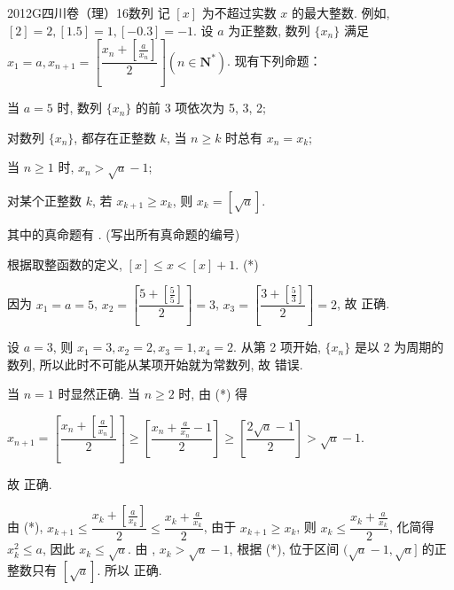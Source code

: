 
\begin{problem}{2012}{G}{四川卷（理）}{16}{数列}
记 $[x]$ 为不超过实数 $x$ 的最大整数. 例如, $[2]=2, [1.5]=1, [-0.3]=-1$. 设 $a$ 为正整数, 数列 $\{x_n\}$ 满足 $x_1=a, x_{n+1}=\left[\dfrac{x_n+[\frac{a}{x_n}]}{2}\right] (n \in \mathbf{N}^*)$. 现有下列命题：

 当 $a=5$ 时, 数列 $\{x_n\}$ 的前 3 项依次为 5, 3, 2;

 对数列 $\{x_n\}$, 都存在正整数 $k$, 当 $n \ge k$ 时总有 $x_n=x_k$;

 当 $n \ge 1$ 时, $x_n > \sqrt{a}-1$;

 对某个正整数 $k$, 若 $x_{k+1} \ge x_k$, 则 $x_k = [\sqrt{a}]$.

其中的真命题有 \underline{\hspace{4em}}. (写出所有真命题的编号)
\end{problem}

\begin{answer}
\end{answer}

\begin{solutions}
根据取整函数的定义, $[x] \le x < [x]+1$. (*)

 因为 $x_1=a=5$, $x_2=\left[\dfrac{5+[\frac{5}{5}]}{2}\right]=3$, $x_3=\left[\dfrac{3+[\frac{5}{3}]}{2}\right]=2$, 故  正确.

 设 $a=3$, 则 $x_1=3, x_2=2, x_3=1, x_4=2$. 从第 2 项开始, $\{x_n\}$ 是以 2 为周期的数列, 所以此时不可能从某项开始就为常数列, 故  错误.

 当 $n=1$ 时显然正确. 当 $n \ge 2$ 时, 由 (*) 得

$x_{n+1}=\left[\dfrac{x_n+[\frac{a}{x_n}]}{2}\right] \ge \left[\dfrac{x_n+\frac{a}{x_n}-1}{2}\right] \ge \left[\dfrac{2\sqrt{a}-1}{2}\right] > \sqrt{a}-1$. 

故  正确.

 由 (*), $x_{k+1} \le \dfrac{x_k+[\frac{a}{x_k}]}{2} \le \dfrac{x_k+\frac{a}{x_k}}{2}$, 由于 $x_{k+1} \ge x_k$, 则 $x_k \le \dfrac{x_k+\frac{a}{x_k}}{2}$, 化简得 $x_k^2 \le a$, 因此 $x_k \le \sqrt{a}$.
由 , $x_k > \sqrt{a}-1$, 根据 (*), 位于区间 $(\sqrt{a}-1, \sqrt{a}]$ 的正整数只有 $[\sqrt{a}]$. 所以  正确.
\end{solutions}